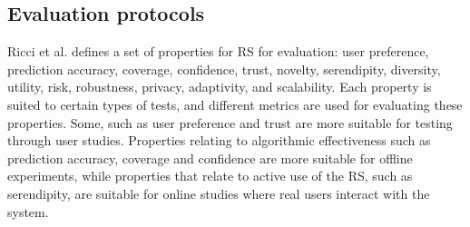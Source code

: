 \subsection{Evaluation protocols}\label{sec:evaluationmetrics}
Ricci et al.\cite{RecommenderHandbook2015} defines a set of properties for RS for evaluation: user preference, prediction accuracy, coverage, confidence, trust, novelty, serendipity, diversity, utility, risk, robustness, privacy, adaptivity, and scalability.
Each property is suited to certain types of tests, and different metrics are used for evaluating these properties.
Some, such as user preference and trust are more suitable for testing through user studies.
Properties relating to algorithmic effectiveness such as prediction accuracy, coverage and confidence are more suitable for offline experiments, while properties that relate to active use of the RS, such as serendipity, are suitable for online studies where real users interact with the system.
\\\\
